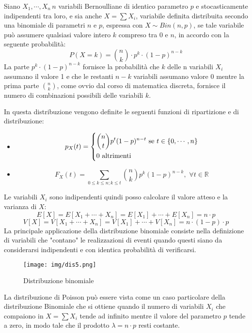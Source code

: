\documentclass[a4paper,12pt, oneside]{book}
\newcommand{\numberset}{\mathbb}
\newcommand{\R}{\numberset{R}}
\begin{document}
Siano $X_1, \cdots, X_n \,  n$ variabili Bernoulliane di identico parametro $p$ e stocasticamente indipendenti tra loro,
e sia anche $X = \sum X_i$, variabile definita distribuita secondo una binomiale di parametri $n$ e $p$,
espressa con $X \sim Bin(n, p)$, se tale variabile può assumere qualsiasi valore intero $k$ compreso tra 0 e $n$,
in accordo con la seguente probabilità:
\[ P(X = k) = \binom{n}{k} \cdot p^k \cdot (1 - p) ^{n-k} \]
La parte $p^k \cdot (1-p)^{n - k}$ fornisce la probabilità che $k$ delle n variabili $X_i$ assumano il valore 1
e che le restanti $n - k$ variabili assumano valore 0 mentre la prima parte $\binom{n}{k}$, come ovvio dal
corso di matematica discreta, fornisce il numero  di combinazioni possibili delle variabili $k$.

In questa distribuzione vengono definite le seguenti funzioni di ripartizione e di distribuzione:
\begin{itemize}
    \item \[p_X(t) = \begin{dcases}
                        \binom{n}{t} p^t (1-p)^{n-t} \mbox{ se } t \in \{0,\cdots, n\}\\
                        0 \mbox{ altrimenti }\\
                     \end{dcases} \]
    \item \[F_X(t) = \sum_{0 \leq k \leq n; k\leq t} \binom{n}{k} p^k (1-p) ^{n - k},\,\,\forall t \in \R\]
\end{itemize}
Le variabili $X_i$ sono indipendenti quindi posso calcolare il valore atteso e la varianza di $X$:
\[E[X] = E[X_1 + \cdots + X_n] = E[X_1] + \cdots + E[X_n] = n \cdot p\]
\[V[X] = V[X_1 + \cdots + X_n] = V[X_1] + \cdots + V[X_n] = n \cdot (1-p) \cdot p\]
La principale applicazione della distribuzione binomiale consiste nella definizione di variabili che "contano" le 
realizzazioni di eventi quando questi siano da considerarsi indipendenti e con identica probabilità di verificarsi.

\begin{figure}
    \caption{Distribuzione binomiale}
    \label{fig:binomiale}
	\texttt{[image: img/dis5.png]}
\end{figure}
La distribuzione di Poisson può essere vista come un caso particolare della distribuzione Binomiale 
che si ottiene quando il numero di variabili $X_i$ che compaiono in $X = \sum X_i$ tende ad infinito 
mentre il valore del parametro $p$ tende a zero, in modo tale che il prodotto $\lambda = n\cdot p$ resti costante. 
\end{document}
